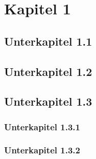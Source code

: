 
\chapter{Kapitel 1}

\section{Unterkapitel 1.1}
\section{Unterkapitel 1.2}
\section{Unterkapitel 1.3}
\subsection{Unterkapitel 1.3.1}
\subsection{Unterkapitel 1.3.2}